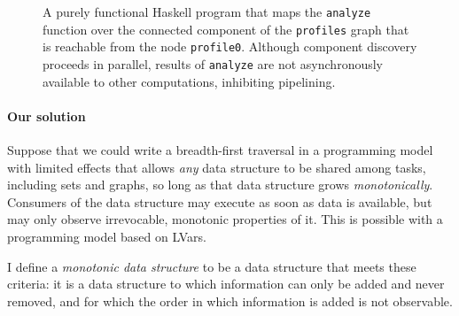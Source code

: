 \begin{figure}
  
  \caption{\footnotesize A purely functional Haskell program that maps
    the \lstinline|analyze| function over the connected component of
    the \lstinline|profiles| graph that is reachable from the node
    \lstinline|profile0|.  Although component discovery proceeds in
    parallel, results of \lstinline|analyze| are not asynchronously
    available to other computations, inhibiting pipelining.}
  \label{f:bfs-pure}
\end{figure}

\paragraph{Our solution}

Suppose that we could write a breadth-first traversal in a programming
model with limited effects that allows \emph{any} data structure to be
shared among tasks, including sets and graphs, so long as that data
structure grows \emph{monotonically}.  Consumers of the data structure
may execute as soon as data is available, but may only observe
irrevocable, monotonic properties of it. This is possible with a
programming model based on LVars.

I define a \emph{monotonic data structure} to be a data structure that
meets these criteria: it is a data structure to which information can
only be added and never removed, and for which the order in which
information is added is not observable.
